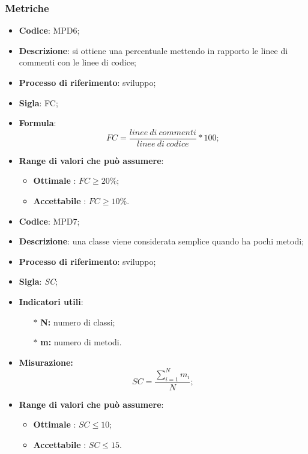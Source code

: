 \subsubsection{Metriche}
\vspace{-1cm}
\begin{itemize}
	\item \textbf{Codice}: MPD6;
	\item \textbf{Descrizione}: si ottiene una percentuale mettendo in rapporto le linee di commenti con le linee di codice;
	\item \textbf{Processo di riferimento}: sviluppo;
	\item \textbf{Sigla}: FC;
	\item \textbf{Formula}: \[FC=\frac{linee \ di \ commenti}{linee \ di \ codice}\ast100;\]
	\item \textbf{Range di valori che può assumere}: 
		\begin{itemize}
			\item \textbf{Ottimale} : $FC \geq 20 \%$;
			\item \textbf{Accettabile} : $FC \geq 10 \%$.
		\end{itemize}
\end{itemize}
\vspace{-1cm}
\begin{itemize}
	\item \textbf{Codice}: MPD7;
	\item \textbf{Descrizione}: una classe viene considerata semplice quando ha pochi metodi;
	\item \textbf{Processo di riferimento}: sviluppo;
	\item \textbf{Sigla}: \textit{SC};
	\item \textbf{Indicatori utili}: 
		\begin{itemize}
		\item[$\ast$] \textbf{N:} numero di classi;
		\item[$\ast$] \textbf{m:} numero di metodi.
		\end{itemize}
	\item \textbf{Misurazione:} \[SC=\frac{\sum_{i=1}^{N} m_i}{N};\]
	\item \textbf{Range di valori che può assumere}: 
		\begin{itemize}
			\item \textbf{Ottimale} : $SC \leq 10$;
			\item \textbf{Accettabile} : $SC \leq 15$.
		\end{itemize}
\end{itemize}
